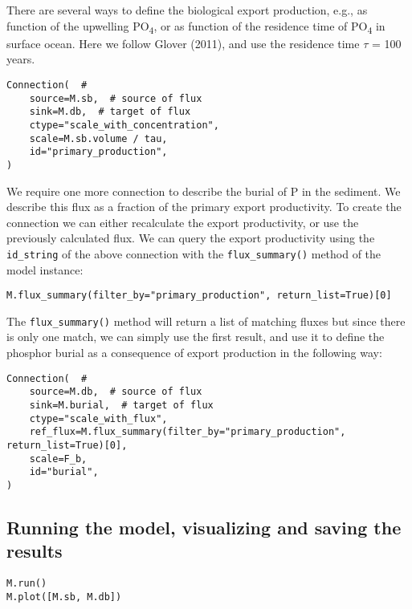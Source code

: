 \documentclass[11pt]{article}
\begin{document}
There are several ways to define the biological export production, e.g., as  function of the upwelling PO\textsubscript{4}, or as function of the residence time of PO\textsubscript{4} in surface ocean. Here we follow Glover (2011), and use the residence time \(\tau\) = 100 years.
\begin{verbatim}
Connection(  #
    source=M.sb,  # source of flux
    sink=M.db,  # target of flux
    ctype="scale_with_concentration",
    scale=M.sb.volume / tau,
    id="primary_production",
)
\end{verbatim}

We require one more connection to describe the burial of P in the sediment. We describe this flux as a fraction of the primary export productivity. To create the connection we can either recalculate the export productivity, or use the previously calculated flux. We can query the export productivity using the \texttt{id\_string} of the above connection with the \texttt{flux\_summary()} method of the model instance:
\begin{verbatim}
M.flux_summary(filter_by="primary_production", return_list=True)[0]
\end{verbatim}
The \texttt{flux\_summary()} method will return a list of matching fluxes but since there is only one match, we can simply use  the first result, and use it to define the phosphor burial as a consequence of export production in the following way:
\begin{verbatim}
Connection(  #
    source=M.db,  # source of flux
    sink=M.burial,  # target of flux
    ctype="scale_with_flux",
    ref_flux=M.flux_summary(filter_by="primary_production", return_list=True)[0],
    scale=F_b,
    id="burial",
)
\end{verbatim}
\subsection{Running the model, visualizing and saving the results}
\label{sec:org977d800}

\begin{verbatim}
M.run()
M.plot([M.sb, M.db])
\end{verbatim}
\end{document}

